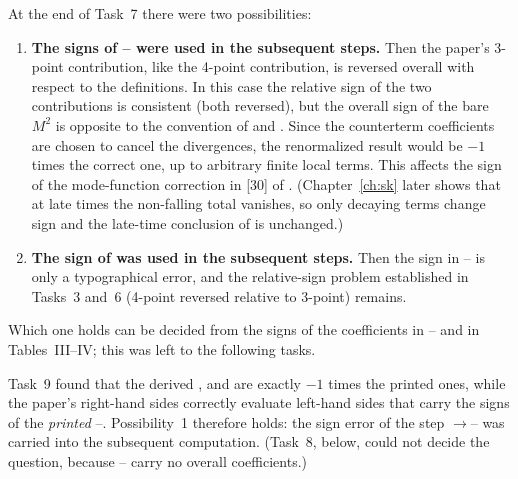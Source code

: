 At the end of Task~7 there were two possibilities:
\begin{enumerate}[leftmargin=18pt]
\item \textbf{The signs of -- were used in the subsequent steps.} Then the paper's 3-point contribution, like the 4-point contribution,
is reversed overall with respect to the definitions. In this case the relative sign of the two contributions is consistent (both reversed), but the overall sign of
the bare $M^2$ is opposite to the convention of  and . Since the counterterm coefficients are chosen to cancel the divergences, the renormalized
result would be $-1$ times the correct one, up to arbitrary finite local terms. This affects the sign of the mode-function correction in [30] of \PI.
(Chapter~\ref{ch:sk} later shows that at late times the non-falling total vanishes, so only decaying terms change sign and the late-time conclusion
of \PII{} is unchanged.)
\item \textbf{The sign of  was used in the subsequent steps.} Then the sign in -- is only a typographical error, and the relative-sign
problem established in Tasks~3 and~6 (4-point reversed relative to 3-point) remains.
\end{enumerate}
Which one holds can be decided from the signs of the coefficients in -- and in Tables~III--IV; this was left to the following tasks.

\begin{notebox}
Task~9 found that the derived ,  and  are exactly $-1$ times the printed ones, while the paper's right-hand sides correctly evaluate left-hand
sides that carry the signs of the \emph{printed} --. Possibility~1 therefore holds: the sign error of the step $\to$-- was carried
into the subsequent computation. (Task~8, below, could not decide the question, because -- carry no overall coefficients.)
\end{notebox}

